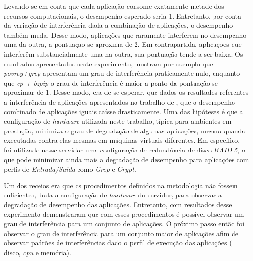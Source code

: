 Levando-se em conta que cada aplicação consome exatamente metade dos recursos computacionais, o desempenho esperado seria 1. Entretanto, por conta da variação de interferência dada a combinação de aplicações, o desempenho também muda. Desse modo, aplicações que raramente interferem no desempenho uma da outra, a pontuação se aproxima de 2. Em contrapartida, aplicações que interferêm substancialmente uma na outra, sua pontuação tende a ser baixa. Os resultados apresentados neste experimento, mostram por exemplo que \textit{povray+grep} apresentam um grau de interferência praticamente nulo, enquanto que \textit{cp + bzpip} o grau de interferência é maior a ponto da pontuação se aproximar de 1. Desse modo, era de se esperar, que dados os resultados referentes a interferência de aplicações apresentados no trabalho de , que o desempenho combinado de aplicações iguais caísse drasticamente. Uma das hipóteses é que a configuração de \textit{hardware} utilizada neste trabalho, típica para ambientes em produção, minimiza o grau de degradação de algumas aplicações, mesmo quando executadas contra elas mesmas em máquinas virtuais diferentes. Em específico, foi utilizado nesse servidor uma configuração de redundância de disco \textit{RAID 5}, o que pode minimizar ainda mais a degradação de desempenho para aplicações com perfis de \textit{Entrada/Saida} como \textit{Grep} e \textit{Crypt}.


Um dos receios era que os procedimentos definidos na metodologia não fossem suficientes, dada a configuração de \textit{hardware} do servidor, para observar a degradação de desempenho das aplicações. Entretanto, com resultados desse experimento demonstraram que com esses procedimentos é possível observar um grau de interferência para um conjunto de aplicações. O próximo passo então foi observar o grau de interferência para um conjunto maior de aplicações afim de observar padrões de interferências dado o perfil de execução das aplicações ( disco, \textit{cpu} e memória).

